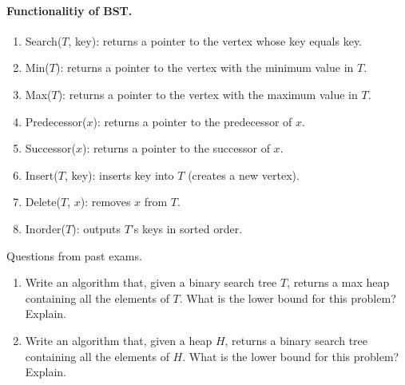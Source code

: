 \paragraph{Functionalitiy of BST.}
\begin{enumerate}
\item Search($T$, key): returns a pointer to the vertex whose key equals key. 
  \item Min($T$): returns a pointer to the vertex with the minimum value in $T$.  
  \item Max($T$): returns a pointer to the vertex with the maximum value in $T$.  
  \item Predecessor($x$): returns a pointer to the predecessor of $x$.  
  \item Successor($x$): returns a pointer to the successor of $x$. 
  \item Insert($T$, key): inserts key into $T$ (creates a new vertex).   
  \item Delete($T$, $x$): removes $x$ from $T$. 
  \item Inorder($T$): outputs $T$'s keys in sorted order.

\end{enumerate}


\begin{example}Questions from past exams.
  \begin{enumerate}
    \item Write an algorithm that, given a binary search tree $T$, returns a max heap containing all the elements of $T$. What is the lower bound for this problem? Explain.
    \item Write an algorithm that, given a heap $H$, returns a binary search tree containing all the elements of $H$. What is the lower bound for this problem? Explain.
  \end{enumerate}
\end{example}

